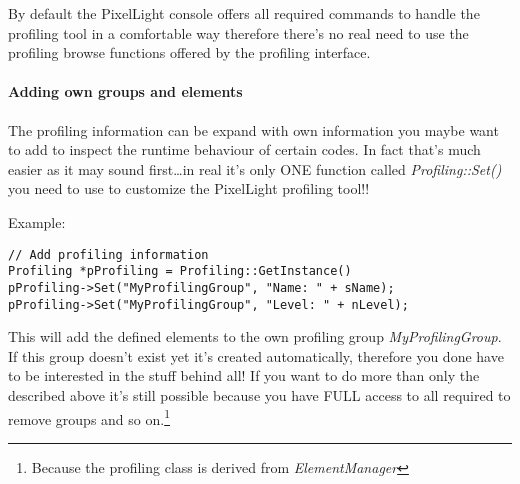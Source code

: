 By default the PixelLight console offers all required commands to handle the profiling tool in a comfortable way therefore there's no real need to use the profiling browse functions offered by the profiling interface.


\paragraph{Adding own groups and elements}
The profiling information can be expand with own information you maybe want to add to inspect the runtime behaviour of certain codes. In fact that's much easier as it may sound first\ldots in real it's only ONE function called \emph{Profiling::Set()} you need to use to customize the PixelLight profiling tool!!

Example:

\begin{lstlisting}[caption=Profiling usage example]
// Add profiling information
Profiling *pProfiling = Profiling::GetInstance()
pProfiling->Set("MyProfilingGroup", "Name: " + sName);
pProfiling->Set("MyProfilingGroup", "Level: " + nLevel);
\end{lstlisting}

This will add the defined elements to the own profiling group \emph{MyProfilingGroup}. If this group doesn't exist yet it's created automatically, therefore you done have to be interested in the stuff behind all! If you want to do more than only the described above it's still possible because you have FULL access to all required to remove groups and so on.\footnote{Because the profiling class is derived from \emph{ElementManager}}
